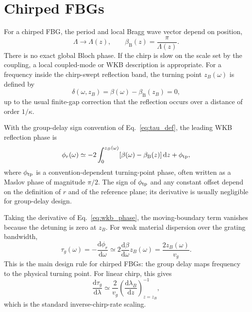 \documentclass[aps,pra,twocolumn,superscriptaddress,nofootinbib]{revtex4-2}
\newcommand{\B}{\mathrm{B}}
\newcommand{\dd}{\mathrm{d}}
\begin{document}
\section{Chirped FBGs}
\label{sec:chirped}

For a chirped FBG, the period and local Bragg wave vector depend on position,
\begin{equation}
    \Lambda\rightarrow \Lambda(z),\qquad
    \beta_\B(z)=\frac{\pi}{\Lambda(z)}.
\end{equation}
There is no exact global Bloch phase.  If the chirp is slow on the scale set by the coupling, a local coupled-mode or WKB description is appropriate.  For a frequency inside the chirp-swept reflection band, the turning point $z_B(\omega)$ is defined by
\begin{equation}
    \delta(\omega,z_B)=\beta(\omega)-\beta_\B(z_B)=0,
    \label{eq:turning_point}
\end{equation}
up to the usual finite-gap correction that the reflection occurs over a distance of order $1/\kappa$.

With the group-delay sign convention of Eq.~\eqref{eq:tau_def}, the leading WKB reflection phase is
\begin{equation}
    \phi_r(\omega)\simeq
    -2\int_0^{z_B(\omega)}[\beta(\omega)-\beta_\B(z)]\,\dd z+\phi_{\rm tp},
    \label{eq:wkb_phase}
\end{equation}
where $\phi_{\rm tp}$ is a convention-dependent turning-point phase, often written as a Maslov phase of magnitude $\pi/2$.  The sign of $\phi_{\rm tp}$ and any constant offset depend on the definition of $r$ and of the reference plane; its derivative is usually negligible for group-delay design.

Taking the derivative of Eq.~\eqref{eq:wkb_phase}, the moving-boundary term vanishes because the detuning is zero at $z_B$.  For weak material dispersion over the grating bandwidth,
\begin{equation}
    \tau_g(\omega)=-\frac{\dd\phi_r}{\dd\omega}
    \simeq 2\frac{\dd\beta}{\dd\omega}z_B(\omega)
    =\frac{2z_B(\omega)}{v_g}.
    \label{eq:chirped_delay}
\end{equation}
This is the main design rule for chirped FBGs: the group delay maps frequency to the physical turning point.  For linear chirp, this gives
\begin{equation}
    \frac{\dd\tau_g}{\dd\lambda}
    \simeq \frac{2}{v_g}\left(\frac{\dd\lambda_B}{\dd z}\right)^{-1}_{z=z_B},
    \label{eq:chirped_dispersion}
\end{equation}
which is the standard inverse-chirp-rate scaling.
\end{document}
